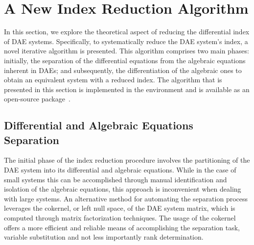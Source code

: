 

\section{A New Index Reduction Algorithm}
\label{chap4:sec:algorithm}

In this section, we explore the theoretical aspect of reducing the differential index of \ac{DAE} systems. Specifically, to systematically reduce the \ac{DAE} system's index, a novel iterative algorithm is presented. This algorithm comprises two main phases: initially, the separation of the differential equations from the algebraic equations inherent in \acp{DAE}; and subsequently, the differentiation of the algebraic ones to obtain an equivalent system with a reduced index. The algorithm that is presented in this section is implemented in the \Maple{} environment and is available as an open-source package~\cite{indigo}.

\subsection{Differential and Algebraic Equations Separation}
\label{chap4:sec:separation}

The initial phase of the index reduction procedure involves the partitioning of the \ac{DAE} system into its differential and algebraic equations. While in the case of small systems this can be accomplished through manual identification and isolation of the algebraic equations, this approach is inconvenient when dealing with large systems. An alternative method for automating the separation process leverages the cokernel, or left null space, of the \ac{DAE} system matrix, which is computed through matrix factorization techniques. The usage of the cokernel offers a more efficient and reliable means of accomplishing the separation task, variable substitution and not less importantly rank determination.

